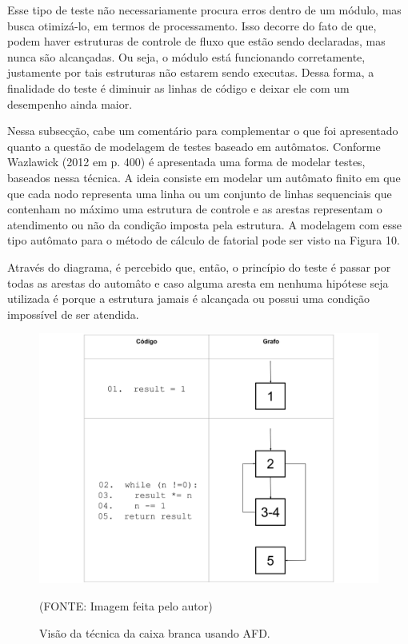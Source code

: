 \documentclass[
    12pt,       %
    openright,      %
    twoside,      %
    a4paper,      %
    english,      %
    french,       %
    spanish,      %
    brazil,       %
    ]{abntex2}
\begin{document}
              Esse tipo de teste não necessariamente procura erros dentro de um módulo, mas busca
              otimizá-lo, em termos de processamento. Isso decorre do fato de que, podem haver
              estruturas de controle de fluxo que estão sendo declaradas, mas nunca são alcançadas.
              Ou seja, o módulo está funcionando corretamente, justamente por tais estruturas não
              estarem sendo executas. Dessa forma, a finalidade do teste é diminuir as linhas de código
              e deixar ele com um desempenho ainda maior.

              Nessa subsecção, cabe um comentário para complementar o que foi apresentado quanto a
              questão de modelagem de testes baseado em autômatos. Conforme Wazlawick (2012 em p. 400) é
              apresentada uma forma de modelar testes, baseados nessa técnica. A ideia consiste em
              modelar um autômato finito em que que cada nodo representa uma linha ou um conjunto de
              linhas sequenciais que contenham no máximo uma estrutura de controle e as arestas
              representam o atendimento ou não da condição imposta pela estrutura. A modelagem
              com esse tipo autômato para o método de cálculo de fatorial pode ser visto na Figura 10.

              Através do diagrama, é percebido que, então, o princípio do teste é passar por todas as
              arestas do automâto e caso alguma aresta em nenhuma hipótese seja utilizada é porque a
              estrutura jamais é alcançada ou possui uma condição impossível de ser atendida.

              \begin{figure}[htbp]
                  \begin{center}
                      \includegraphics[width=1.0\textwidth]{img/whitebox.png}
                  \end{center}
              \caption{\label{fig:passaro}Visão da técnica da caixa branca usando AFD.}
              \begin{center}(FONTE: Imagem feita pelo autor)\end{center}
              \end{figure}
\end{document}

